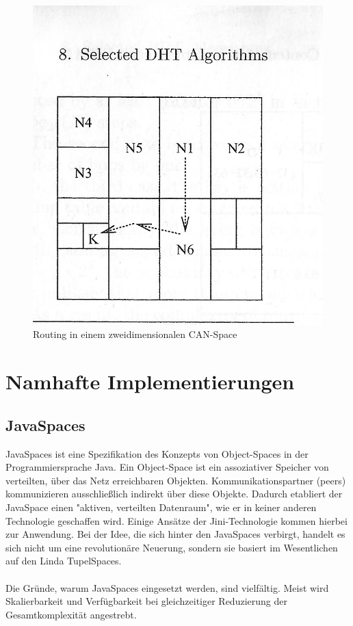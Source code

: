 \documentclass[a4paper,12pt]{scrreprt}
\begin{document}
					\begin{figure}
						\centering
						\includegraphics[width=0.55\linewidth]{./graphics/CAN_Routing}
						\caption{Routing in einem zweidimensionalen CAN-Space}
						\label{fig:CAN_Routing}
					\end{figure}
					 
\chapter{Namhafte Implementierungen}
	\section{JavaSpaces}
		JavaSpaces ist eine Spezifikation des Konzepts von Object-Spaces in der Programmiersprache Java. Ein Object-Space ist ein assoziativer Speicher von verteilten, über das Netz erreichbaren Objekten. Kommunikationspartner (peers) kommunizieren ausschließlich indirekt über diese Objekte. Dadurch etabliert der JavaSpace einen "aktiven, verteilten Datenraum", wie er in keiner anderen Technologie geschaffen wird. Einige Ansätze der Jini-Technologie kommen hierbei zur Anwendung. Bei der Idee, die sich hinter den JavaSpaces verbirgt, handelt es sich nicht um eine revolutionäre Neuerung, sondern sie basiert im Wesentlichen auf den Linda TupelSpaces.\\\\	
		Die Gründe, warum JavaSpaces eingesetzt werden, sind vielfältig. Meist wird Skalierbarkeit und Verfügbarkeit bei gleichzeitiger Reduzierung der Gesamtkomplexität angestrebt.
		
		
\end{document}
